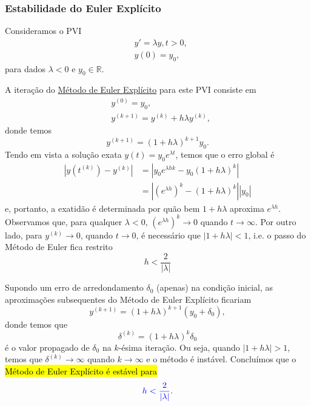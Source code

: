 \subsubsection{Estabilidade do Euler Explícito}

Consideramos o PVI
\begin{subequations}\label{cap_pvi_sec_eulerimp:eq:pvi_estabilidade}
  \begin{align}
    &y' = \lambda y, t > 0,\\
    &y(0) = y_0,
  \end{align}
\end{subequations}
para dados $\lambda < 0$ e $y_0\in\mathbb{R}$.

A iteração do \href{https://notaspedrok.com.br/notas/MatematicaNumericaII/cap_pvi_sec_euler.html}{Método de Euler Explícito} para este PVI consiste em
\begin{equation}
  \begin{aligned}
    &y^{(0)} = y_0,\\
    &y^{(k+1)} = y^{(k)} + h\lambda y^{(k)},
  \end{aligned}
\end{equation}
donde temos
\begin{equation}
  y^{(k+1)} = (1 + h\lambda)^{k+1}y_0.
\end{equation}
Tendo em vista a solução exata $y(t) = y_0e^{\lambda t}$, temos que o erro global é
\begin{align}
  \left|y\left(t^{(k)}\right) - y^{(k)}\right| &= \left|y_0e^{\lambda hk} - y_0(1 + h\lambda)^k\right|\\
                                               &= \left|\left(e^{\lambda h}\right)^k - (1 + h\lambda)^k\right||y_0|
\end{align}
e, portanto, a exatidão é determinada por quão bem $1 + h\lambda$ aproxima $e^{\lambda h}$. Observamos que, para qualquer $\lambda < 0$, $\left(e^{\lambda h}\right)^k\to 0$ quando $t\to\infty$. Por outro lado, para $y^{(k)}\to 0$, quando $t\to 0$, é necessário que $|1 + h\lambda| < 1$, i.e. o passo do Método de Euler fica restrito
\begin{equation}
  h < \frac{2}{|\lambda|}
\end{equation}

Supondo um erro de arredondamento $\delta_0$ (apenas) na condição inicial, as aproximações subsequentes do Método de Euler Explícito ficariam
\begin{equation}
  y^{(k+1)} = (1 + h\lambda)^{k+1}\left(y_0+\delta_0\right),
\end{equation}
donde temos que
\begin{equation}
  \delta^{(k)} = (1 + h\lambda)^{k}\delta_0
\end{equation}
é o valor propagado de $\delta_0$ na $k$-ésima iteração. Ou seja, quando $|1 + h\lambda| > 1$, temos que $\delta^{(k)}\to\infty$ quando $k\to\infty$ e o método é instável. Concluímos que o \hl{Método de Euler Explícito é estável para}
\begin{equation}\label{cap_pvi_eulerimp:eq:condest}\color{blue}h < \frac{2}{|\lambda|}.
\end{equation}


